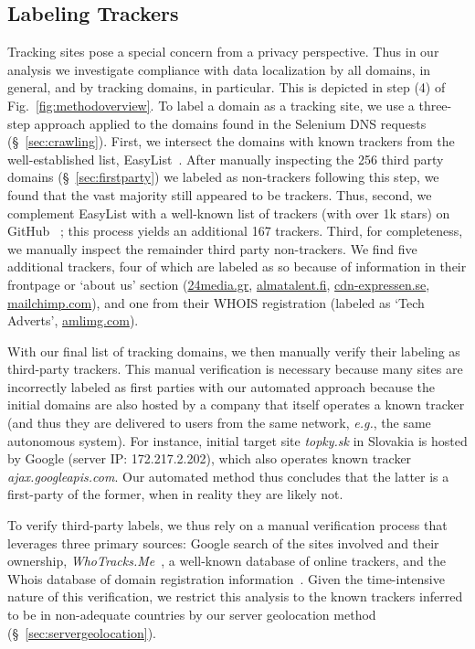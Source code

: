 \subsection{Labeling Trackers}
\label{sec:trackerlabels}
Tracking sites pose a special concern from a privacy perspective. Thus in our 
analysis we investigate compliance with data localization by all domains,
in general, and by tracking domains, in particular. 
This is depicted in step (4) of Fig.~\ref{fig:methodoverview}.
To label a domain as a tracking site, we use a three-step approach
applied to the domains found in the Selenium DNS requests (\S~\ref{sec:crawling}).
First, we intersect the domains with known trackers from the well-established list,
EasyList~\cite{EasyList}. After manually inspecting the 256 third party domains (\S~\ref{sec:firstparty}) 
we labeled as non-trackers
following this step, we found that the vast majority still appeared to be trackers. 
Thus, second, we complement EasyList with a well-known list of trackers
(with over 1k stars) on GitHub ~\cite{GitHosts}; this process yields
an additional 167 trackers. 
Third, 
for completeness, we manually inspect the remainder third party non-trackers. 
We find five additional trackers, four of which are labeled as so because of
information in their frontpage or `about us' section (\url{24media.gr}, \url{almatalent.fi}, 
\url{cdn-expressen.se}, \url{mailchimp.com}), and 
one from their WHOIS registration (labeled as `Tech Adverts', \url{amlimg.com}).
 
With our final list of tracking domains, we then manually verify 
their labeling as third-party trackers. This manual verification is necessary 
because many sites are incorrectly labeled as first parties with 
our automated approach because the initial domains 
are also hosted by a company that
itself operates a known tracker (and thus they are
delivered to users from the same network, \textit{e.g.},
the same autonomous system). For instance,
initial target site \textit{topky.sk} in Slovakia is
hosted by Google (server IP: 172.217.2.202), 
which also operates known tracker
\textit{ajax.googleapis.com}. Our automated method thus 
concludes that the latter is a first-party of the former,
when in reality they are likely not.

To verify third-party labels, we thus rely on a manual 
verification process that leverages three primary sources:
Google search of the sites involved and their ownership, 
\textit{WhoTracks.Me}~\cite{whotracksme}, a well-known database
of online trackers, and the Whois database of domain registration 
information~\cite{whois}. Given the time-intensive nature
of this verification, we restrict this analysis to the
known trackers inferred to be in non-adequate countries
by our server geolocation method (\S~\ref{sec:servergeolocation}).
